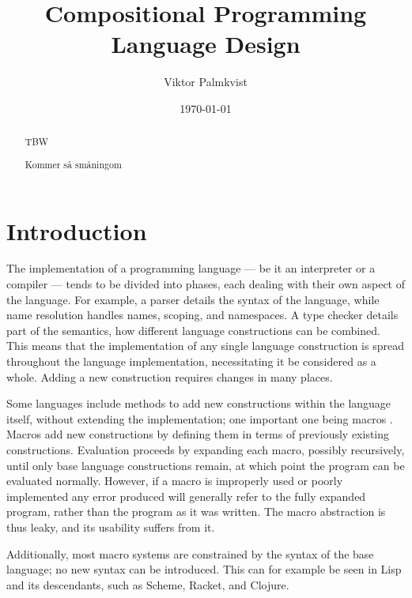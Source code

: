 \documentclass{kththesis}
\title{Compositional Programming Language Design}
\author{Viktor Palmkvist}
\date{\today}
\begin{document}
\frontmatter

\titlepage

\begin{abstract}
TBW
\end{abstract}


\begin{otherlanguage}{swedish}
\begin{abstract}
Kommer så småningom
\end{abstract}
\end{otherlanguage}


\tableofcontents


\mainmatter


\chapter{Introduction}

The implementation of a programming language --- be it an interpreter or a compiler --- tends to be divided into phases, each dealing with their own aspect of the language. For example, a parser details the syntax of the language, while name resolution handles names, scoping, and namespaces. A type checker details part of the semantics, how different language constructions can be combined. This means that the implementation of any single language construction is spread throughout the language implementation, necessitating it be considered as a whole. Adding a new construction requires changes in many places.

Some languages include methods to add new constructions within the language itself, without extending the implementation; one important one being macros \cite{plt-tr1,Hickey2008,Matsakis2014}. Macros add new constructions by defining them in terms of previously existing constructions. Evaluation proceeds by expanding each macro, possibly recursively, until only base language constructions remain, at which point the program can be evaluated normally. However, if a macro is improperly used or poorly implemented any error produced will generally refer to the fully expanded program, rather than the program as it was written. The macro abstraction is thus leaky, and its usability suffers from it.

Additionally, most macro systems are constrained by the syntax of the base language; no new syntax can be introduced. This can for example be seen in Lisp and its descendants, such as Scheme, Racket, and Clojure.
\end{document}
